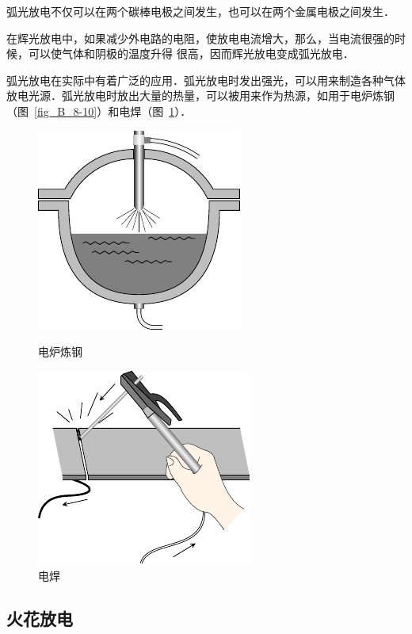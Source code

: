 弧光放电不仅可以在两个碳棒电极之间发生，也可以在两个金属电极之间发生．

在辉光放电中，如果减少外电路的电阻，使放电电流增大，那么，当电流很强的时候，可以使气体和阴极的温度升得
很高，因而辉光放电变成弧光放电．

弧光放电在实际中有着广泛的应用．弧光放电时发出强光，可以用来制造各种气体放电光源．弧光放电时放出大量的热量，可以被用来作为热源，如用于电炉炼钢（图~\ref{fig_B_8-10}）和电焊（图~\ref{fig_B_8-11}）．
\begin{figure}[htbp]
    \centering
    \begin{minipage}[t]{0.48\textwidth}
        \centering
        \includegraphics{fig/B/8-10.pdf}
        \caption{电炉炼钢}\label{fig_B_8-10}
    \end{minipage}
    \begin{minipage}[t]{0.48\textwidth}
        \centering
        \includegraphics{fig/B/8-11.pdf}
        \caption{电焊}\label{fig_B_8-11}
    \end{minipage}
\end{figure}

\subsection{火花放电}



